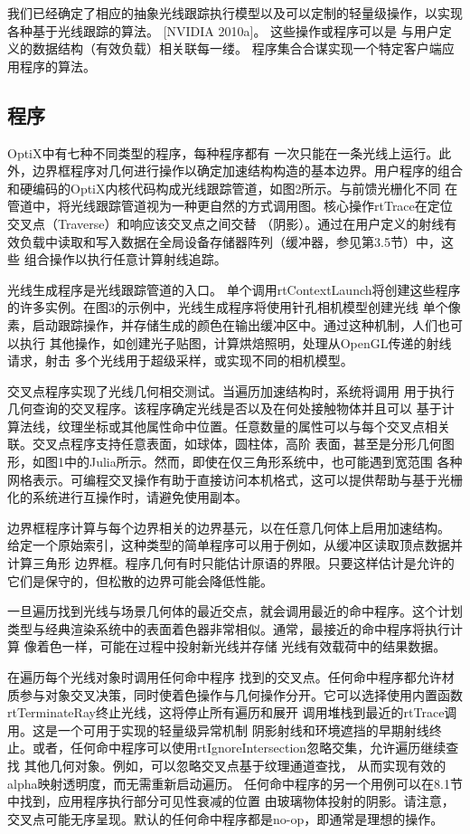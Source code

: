 我们已经确定了相应的抽象光线跟踪执行模型以及可以定制的轻量级操作，以实现各种基于光线跟踪的算法。 [NVIDIA 2010a]。 这些操作或程序可以是
与用户定义的数据结构（有效负载）相关联每一缕。 程序集合合谋实现一个特定客户端应用程序的算法。

\subsection{程序}

OptiX中有七种不同类型的程序，每种程序都有
一次只能在一条光线上运行。此外，边界框程序对几何进行操作以确定加速结构构造的基本边界。用户程序的组合
和硬编码的OptiX内核代码构成光线跟踪管道，如图2所示。与前馈光栅化不同
在管道中，将光线跟踪管道视为一种更自然的方式调用图。核心操作rtTrace在定位交叉点（Traverse）和响应该交叉点之间交替
（阴影）。通过在用户定义的射线有效负载中读取和写入数据在全局设备存储器阵列（缓冲器，参见第3.5节）中，这些
组合操作以执行任意计算射线追踪。

光线生成程序是光线跟踪管道的入口。
单个调用rtContextLaunch将创建这些程序的许多实例。在图3的示例中，光线生成程序将使用针孔相机模型创建光线
单个像素，启动跟踪操作，并存储生成的颜色在输出缓冲区中。通过这种机制，人们也可以执行
其他操作，如创建光子贴图，计算烘焙照明，处理从OpenGL传递的射线请求，射击
多个光线用于超级采样，或实现不同的相机模型。

交叉点程序实现了光线几何相交测试。当遍历加速结构时，系统将调用
用于执行几何查询的交叉程序。该程序确定光线是否以及在何处接触物体并且可以
基于计算法线，纹理坐标或其他属性命中位置。任意数量的属性可以与每个交叉点相关联。交叉点程序支持任意表面，如球体，圆柱体，高阶
表面，甚至是分形几何图形，如图1中的Julia所示。然而，即使在仅三角形系统中，也可能遇到宽范围
各种网格表示。可编程交叉操作有助于直接访问本机格式，这可以提供帮助与基于光栅化的系统进行互操作时，请避免使用副本。

边界框程序计算与每个边界相关的边界基元，以在任意几何体上启用加速结构。
给定一个原始索引，这种类型的简单程序可以用于例如，从缓冲区读取顶点数据并计算三角形
边界框。程序几何有时只能估计原语的界限。只要这样估计是允许的
它们是保守的，但松散的边界可能会降低性能。

一旦遍历找到光线与场景几何体的最近交点，就会调用最近的命中程序。这个计划
类型与经典渲染系统中的表面着色器非常相似。通常，最接近的命中程序将执行计算
像着色一样，可能在过程中投射新光线并存储
光线有效载荷中的结果数据。

在遍历每个光线对象时调用任何命中程序
找到的交叉点。任何命中程序都允许材质参与对象交叉决策，同时使着色操作与几何操作分开。它可以选择使用内置函数rtTerminateRay终止光线，这将停止所有遍历和展开
调用堆栈到最近的rtTrace调用。这是一个可用于实现的轻量级异常机制
阴影射线和环境遮挡的早期射线终止。或者，任何命中程序可以使用rtIgnoreIntersection忽略交集，允许遍历继续查找
其他几何对象。例如，可以忽略交叉点基于纹理通道查找，
从而实现有效的alpha映射透明度，而无需重新启动遍历。
任何命中程序的另一个用例可以在8.1节中找到，应用程序执行部分可见性衰减的位置
由玻璃物体投射的阴影。请注意，交叉点可能无序呈现。默认的任何命中程序都是no-op，即通常是理想的操作。

